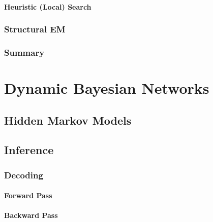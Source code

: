             \subsubsection{Heuristic (Local) Search} %

        \subsection{Structural EM} %

        \subsection{Summary} %

\chapter{Dynamic Bayesian Networks} %

    \section{Hidden Markov Models} %

    \section{Inference} %

        \subsection{Decoding} %

            \subsubsection{Forward Pass} %

            \subsubsection{Backward Pass} %

